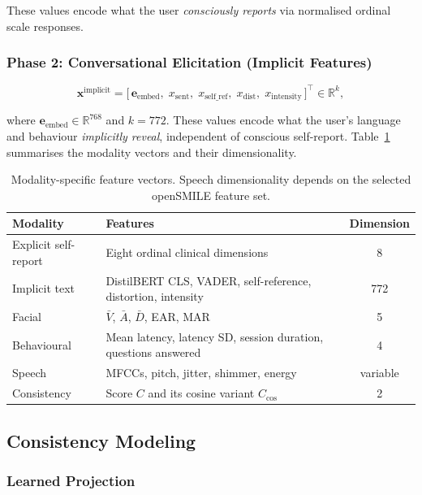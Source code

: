 \documentclass[12pt]{article}
\begin{document}
\noindent These values encode what the user \emph{consciously reports} via
normalised ordinal scale responses.

\subsubsection{Phase 2: Conversational Elicitation (Implicit Features)}

\begin{equation}
\mathbf{x}^{\text{implicit}} = \bigl[\, \mathbf{e}_{\text{embed}},\;
x_{\text{sent}},\; x_{\text{self\_ref}},\; x_{\text{dist}},\;
x_{\text{intensity}} \,\bigr]^{\top} \in \mathbb{R}^{k},
\end{equation}

\noindent where $\mathbf{e}_{\text{embed}} \in \mathbb{R}^{768}$ and
$k = 772$. These values encode what the user's language and behaviour
\emph{implicitly reveal}, independent of conscious self-report.
Table~\ref{tab:vectors} summarises the modality vectors and their
dimensionality.

\begin{table}[H]
\centering
\caption{Modality-specific feature vectors. Speech dimensionality depends
on the selected openSMILE feature set.}
\label{tab:vectors}
\begin{tabular}{@{}llc@{}}
\toprule
Modality & Features & Dimension \\
\midrule
Explicit self-report & Eight ordinal clinical dimensions & 8 \\
Implicit text & DistilBERT CLS, VADER, self-reference, distortion, intensity & 772 \\
Facial & $\bar{V}$, $\bar{A}$, $\bar{D}$, EAR, MAR & 5 \\
Behavioural & Mean latency, latency SD, session duration, questions answered & 4 \\
Speech & MFCCs, pitch, jitter, shimmer, energy & variable \\
Consistency & Score $C$ and its cosine variant $C_{\cos}$ & 2 \\
\bottomrule
\end{tabular}
\end{table}

\subsection{Consistency Modeling}
\label{sec:consistency}

\subsubsection{Learned Projection}
\end{document}
